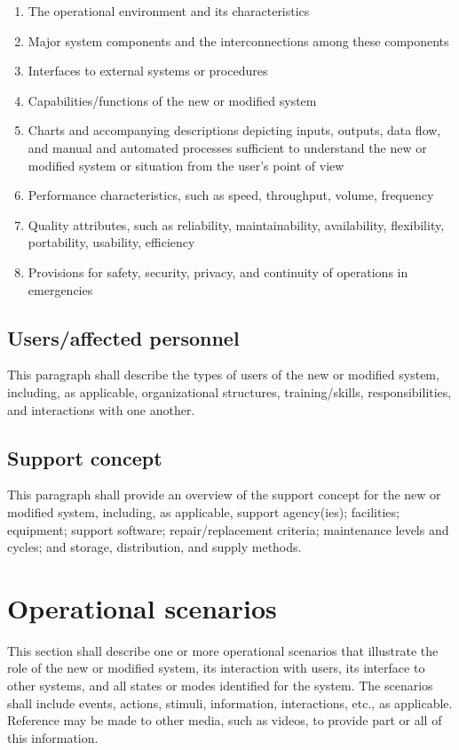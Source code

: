 \documentclass{fidata-report-template}
\begin{document}
\begin{enumerate}
\itemsep1pt\parskip0pt
\item
  The operational environment and its characteristics
\item
  Major system components and the interconnections among these
  components
\item
  Interfaces to external systems or procedures
\item
  Capabilities/functions of the new or modified system
\item
  Charts and accompanying descriptions depicting inputs, outputs, data
  flow, and manual and automated processes sufficient to understand the
  new or modified system or situation from the user's point of view
\item
  Performance characteristics, such as speed, throughput, volume,
  frequency
\item
  Quality attributes, such as reliability, maintainability,
  availability, flexibility, portability, usability, efficiency
\item
  Provisions for safety, security, privacy, and continuity of operations
  in emergencies
\end{enumerate}

\subsection{Users/affected personnel}

This paragraph shall describe the types of users of the new or modified
system, including, as applicable, organizational structures,
training/skills, responsibilities, and interactions with one another.

\subsection{Support concept}

This paragraph shall provide an overview of the support concept for the
new or modified system, including, as applicable, support agency(ies);
facilities; equipment; support software; repair/replacement criteria;
maintenance levels and cycles; and storage, distribution, and supply
methods.

\section{Operational scenarios}

This section shall describe one or more operational scenarios that
illustrate the role of the new or modified system, its interaction with
users, its interface to other systems, and all states or modes
identified for the system. The scenarios shall include events, actions,
stimuli, information, interactions, etc., as applicable. Reference may
be made to other media, such as videos, to provide part or all of this
information.
\end{document}
